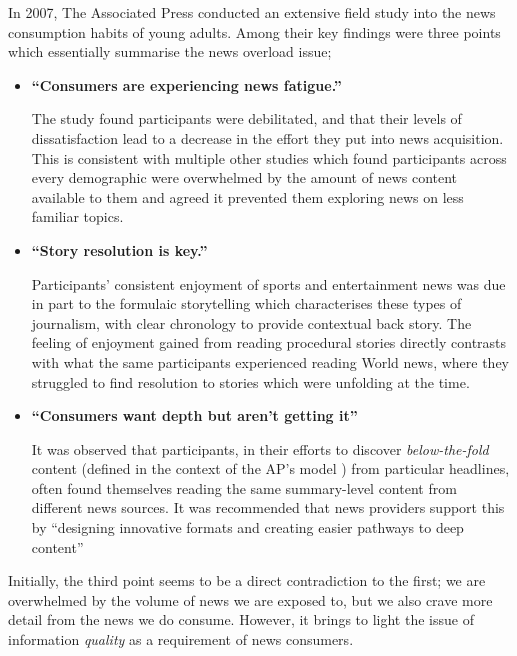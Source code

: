 In 2007, The Associated Press conducted an extensive field study \citep{anewmodelfornews} into the news consumption habits of young adults. Among their key findings were three points which essentially summarise the news overload issue;
\begin{itemize}
	\item \textbf{``Consumers are experiencing news fatigue.''} \par
	The study found participants were debilitated, and that their levels of dissatisfaction lead to a decrease in the effort they put into news acquisition. This is consistent with multiple other studies \citep{newsandtheoverloadedcustomer, UnderstandingTheParticipatoryNewsConsumer, InformationAccessinComplexPoorlyStructuredInformationSpaces} which found participants across every demographic were overwhelmed by the amount of news content available to them and agreed it prevented them exploring news on less familiar topics. 
	
	\item \textbf{``Story resolution is key.''} \par
	Participants' consistent enjoyment of sports and entertainment news was due in part to the formulaic storytelling which characterises these types of journalism, with clear chronology to provide contextual back story. The feeling of enjoyment gained from reading procedural stories directly contrasts with what the same participants experienced reading World news, where they struggled to find resolution to stories which were unfolding at the time.
	
	\item \textbf{``Consumers want depth but aren't getting it''} \par
	It was observed that participants, in their efforts to discover \textit{below-the-fold} content (defined in the context of the AP's model \citep[p.37]{anewmodelfornews}) from particular headlines, often found themselves reading the same summary-level content from different news sources. It was recommended that news providers support this by ``designing innovative formats and creating easier pathways to deep content'' \citep[p.49]{anewmodelfornews}
\end{itemize}

Initially, the third point seems to be a direct contradiction to the first; we are overwhelmed by the volume of news we are exposed to, but we also crave more detail from the news we do consume. However, it brings to light the issue of information \textit{quality} as a requirement of news consumers.

